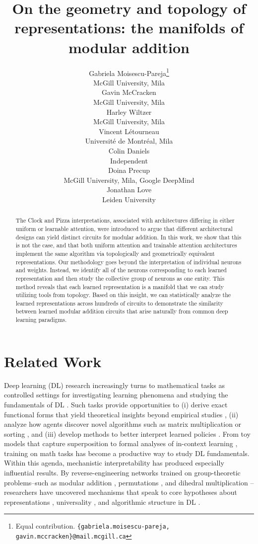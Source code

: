 \documentclass{article} %
\title{On the geometry and topology of representations: the manifolds of modular addition}
\author{%
  Gabriela Moisescu-Pareja\thanks{Equal contribution. \texttt{\{gabriela.moisescu‑pareja, gavin.mccracken\}@mail.mcgill.ca}} \\
  McGill University, Mila\\
   \And
   Gavin McCracken\footnotemark[\value{footnote}] \\
   McGill University, Mila \\
   \And
   Harley Wiltzer \\
   McGill University, Mila \\
   \AND
   Vincent Létourneau \\
   Université de Montréal, Mila \\
   \And
   Colin Daniels \\
   Independent \\
   \And
   Doina Precup \\
   McGill University, Mila, Google DeepMind \\
   \And
   Jonathan Love \\
   Leiden University \\
}
\theoremstyle{plain}
\theoremstyle{definition}
\newtheorem{empirical fact}[theorem]{Empirical Fact}
\begin{document}
\iclrfinalcopy


\maketitle

\begin{abstract}
The Clock and Pizza interpretations, associated with architectures differing in either uniform or learnable attention, were introduced to argue that different architectural designs can yield distinct circuits for modular addition.
In this work, we show that this is not the case, and that both uniform attention and trainable attention architectures implement the same algorithm via topologically and geometrically equivalent representations.
Our methodology goes beyond the interpretation of individual neurons and weights.
Instead, we identify all of the neurons corresponding to each learned representation and then study the collective group of neurons as one entity.
This method reveals that each learned representation is a manifold that we can study utilizing tools from topology.
Based on this insight, we can statistically analyze the learned representations across hundreds of circuits to demonstrate the similarity between learned modular addition circuits that arise naturally from common deep learning paradigms.


\end{abstract}



\section{Related Work}
Deep learning (DL) research increasingly turns to mathematical tasks as controlled settings for investigating learning phenomena and studying the fundamentals of DL \citep{ghosh2025mathematical}. Such tasks provide opportunities to (i) derive exact functional forms that yield theoretical insights beyond empirical studies \citep{mccracken2021using}, (ii) analyze how agents discover novel algorithms such as matrix multiplication or sorting \citep{fawzi2022discovering, mankowitz2023faster}, and (iii) develop methods to better interpret learned policies \citep{raghu2018can}. From toy models that capture superposition \citep{elhage2022toy} to formal analyses of in-context learning \citep{lu2024context, lu2025asymptotic}, training on math tasks has become a productive way to study DL fundamentals. Within this agenda, mechanistic interpretability has produced especially influential results. By reverse-engineering networks trained on group-theoretic problems--such as modular addition \citep{nanda2023progress, chughtai2023toy, gromov2023grokking, morwani2024feature, mccracken2025uncoveringuniversalabstractalgorithm, yip2024modularadditionblackboxescompressing, he2024learning, tao2025how, doshi2023grok}, permutations \citep{standergrokking, wu2024towards}, and dihedral multiplication \cite{mccracken2025representations}--researchers have uncovered mechanisms that speak to core hypotheses about representations \citep{huh2024platonicrepresentationhypothesis}, universality \citep{olah2020zoom, li2015convergent}, and algorithmic structure in DL \citep{eberle2025position}.
\end{document}
